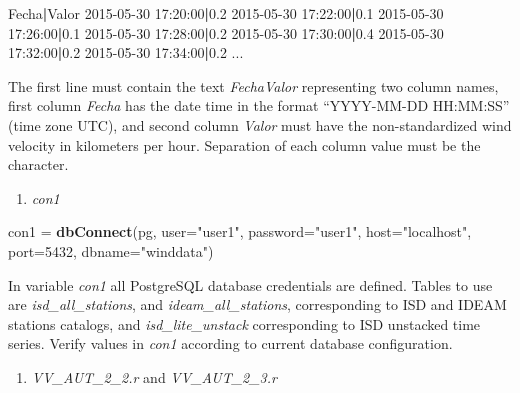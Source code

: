 \documentclass[12pt,oneside]{reedthesis}
\newenvironment{Shaded}{\begin{snugshade}}{\end{snugshade}}
\newcommand{\DataTypeTok}[1]{\textcolor[rgb]{0.13,0.29,0.53}{#1}}
\newcommand{\DecValTok}[1]{\textcolor[rgb]{0.00,0.00,0.81}{#1}}
\newcommand{\ExtensionTok}[1]{#1}
\newcommand{\KeywordTok}[1]{\textcolor[rgb]{0.13,0.29,0.53}{\textbf{#1}}}
\newcommand{\NormalTok}[1]{#1}
\newcommand{\StringTok}[1]{\textcolor[rgb]{0.31,0.60,0.02}{#1}}
\providecommand{\tightlist}{%
  \setlength{\itemsep}{0pt}\setlength{\parskip}{0pt}}
\begin{document}
\vspace{0.4cm}
\begin{Shaded}
\begin{Highlighting}[]
      \ExtensionTok{Fecha}\KeywordTok{|}\ExtensionTok{Valor}
      \ExtensionTok{2015-05-30}\NormalTok{ 17:20:00}\KeywordTok{|}\ExtensionTok{0.2}
      \ExtensionTok{2015-05-30}\NormalTok{ 17:22:00}\KeywordTok{|}\ExtensionTok{0.1}
      \ExtensionTok{2015-05-30}\NormalTok{ 17:26:00}\KeywordTok{|}\ExtensionTok{0.1}
      \ExtensionTok{2015-05-30}\NormalTok{ 17:28:00}\KeywordTok{|}\ExtensionTok{0.2}
      \ExtensionTok{2015-05-30}\NormalTok{ 17:30:00}\KeywordTok{|}\ExtensionTok{0.4}
      \ExtensionTok{2015-05-30}\NormalTok{ 17:32:00}\KeywordTok{|}\ExtensionTok{0.2}
      \ExtensionTok{2015-05-30}\NormalTok{ 17:34:00}\KeywordTok{|}\ExtensionTok{0.2}
      \ExtensionTok{...}
\end{Highlighting}
\end{Shaded}
\normalsize

The first line must contain the text \emph{Fecha\textbar Valor} representing two column names, first column \emph{Fecha} has the date time in the format ``YYYY-MM-DD HH:MM:SS'' (time zone UTC), and second column \emph{Valor} must have the non-standardized wind velocity in kilometers per hour. Separation of each column value must be the \emph{\textbar{}} character.
\begin{enumerate}
\def\labelenumi{\arabic{enumi}.}
\setcounter{enumi}{2}
\tightlist
\item
  \emph{con1}
\end{enumerate}
\scriptsize

\vspace{0.4cm}
\begin{Shaded}
\begin{Highlighting}[]
\NormalTok{      con1 =}\StringTok{ }\KeywordTok{dbConnect}\NormalTok{(pg, }\DataTypeTok{user=}\StringTok{"user1"}\NormalTok{, }\DataTypeTok{password=}\StringTok{"user1"}\NormalTok{, }\DataTypeTok{host=}\StringTok{"localhost"}\NormalTok{, }\DataTypeTok{port=}\DecValTok{5432}\NormalTok{, }\DataTypeTok{dbname=}\StringTok{"winddata"}\NormalTok{)}
\end{Highlighting}
\end{Shaded}
\normalsize

In variable \emph{con1} all PostgreSQL database credentials are defined. Tables to use are \emph{isd\_all\_stations}, and \emph{ideam\_all\_stations}, corresponding to ISD and IDEAM stations catalogs, and \emph{isd\_lite\_unstack} corresponding to ISD unstacked time series. Verify values in \emph{con1} according to current database configuration.
\begin{enumerate}
\def\labelenumi{\arabic{enumi}.}
\setcounter{enumi}{3}
\tightlist
\item
  \emph{VV\_AUT\_2\_2.r} and \emph{VV\_AUT\_2\_3.r}
\end{enumerate}
\scriptsize
\end{document}
